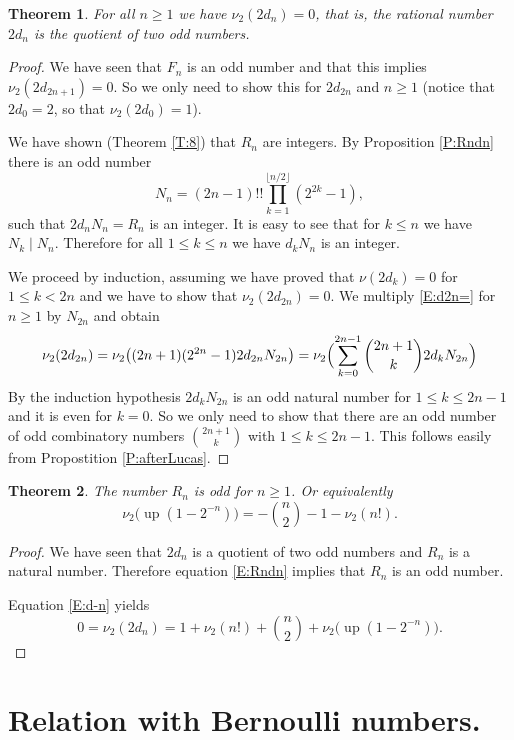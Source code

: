 \documentclass[10pt]{amsart}
\newtheorem{thm}{Theorem}
\theoremstyle{definition}
\theoremstyle{remark}
\DeclareMathOperator\up{up}
\begin{document}
\begin{thm}
For all $n\ge1$ we have $\nu_2(2d_n)=0$, that is, the rational number $2d_n$ is the 
quotient of two odd numbers.
\end{thm}

\begin{proof}
We have seen that $F_n$ is an odd number and that this implies $\nu_2(2d_{2n+1})=0$.
So we only need to show this for $2d_{2n}$ and $n\ge1$ (notice that $2d_0=2$, so that
$\nu_2(2d_0)=1$). 

We have shown (Theorem \ref{T:8}) that $R_n$ are integers. By Proposition \ref{P:Rndn}
there is an odd number
\[N_n=(2n-1)!!\prod_{k=1}^{\lfloor n/2\rfloor}(2^{2k}-1),\]
such that $2d_n N_n=R_n$ is an integer. It is easy to see that for $k\le n$
we have $N_k\mid N_n$.  Therefore for all $1\le k\le n$ we have $d_kN_n$
is an integer. 

We proceed by induction, assuming we have proved that $\nu(2d_k)=0$ for $1\le k<2n$
and we have to show that $\nu_2(2d_{2n})=0$.
We multiply \eqref{E:d2n=} for $n\ge1$  by $N_{2n}$
and obtain
\[\nu_2(2d_{2n})=\nu_2\bigl((2n+1)(2^{2n}-1)2d_{2n}N_{2n}\bigr)
=\nu_2\Bigl(\sum_{k=0}^{2n-1}\binom{2n+1}{k}2d_kN_{2n}\Bigr)\]
By the induction hypothesis $2d_kN_{2n}$ is an odd natural number for $1\le k\le 2n-1$
and it is even for $k=0$. So we only need to show that there are an odd number of
odd combinatory numbers $\binom{2n+1}{k}$ with $1\le k\le 2n-1$. This follows easily 
from Propostition \ref{P:afterLucas}.
\end{proof}

\begin{thm}
The number $R_n$ is odd for $n\ge1$. Or equivalently 
\begin{equation}
\nu_2\bigl(\up(1-2^{-n})\bigr)=-\binom{n}{2}-1-\nu_2(n!).
\end{equation}
\end{thm}
\begin{proof}
We have seen that $2d_n$ is a quotient of two odd numbers and $R_n$ is a 
natural number.   Therefore equation \eqref{E:Rndn} implies
that $R_n$ is an odd number. 

Equation \eqref{E:d-n} yields
\[0=\nu_2(2d_n)=1+\nu_2(n!)+\binom{n}{2}+\nu_2\bigl(\up(1-2^{-n})\bigr).\]
\end{proof}



\section{Relation with Bernoulli numbers.}
\end{document}
